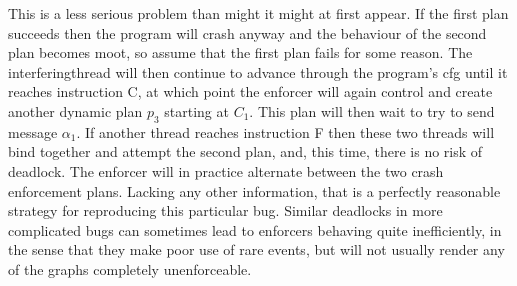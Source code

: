 This is a less serious problem than might it might at first appear.
If the first plan succeeds then the program will crash anyway and the
behaviour of the second plan becomes moot, so assume that the first
plan fails for some reason.  The \gls{interferingthread} will then
continue to advance through the program's \gls{cfg} until it reaches
instruction C, at which point the enforcer will again control and
create another dynamic plan $p_3$ starting at $C_1$.  This plan will
then wait to try to send message $\alpha_1$.  If another thread
reaches instruction F then these two threads will bind together and
attempt the second plan, and, this time, there is no risk of deadlock.
The enforcer will in practice alternate between the two crash
enforcement plans.  Lacking any other information, that is a perfectly
reasonable strategy for reproducing this particular bug.  Similar
deadlocks in more complicated bugs can sometimes lead to enforcers
behaving quite inefficiently, in the sense that they make poor use of
rare events, but will not usually render any of the graphs completely
unenforceable.

